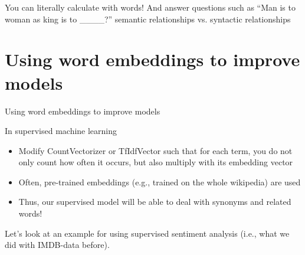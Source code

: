 \documentclass[compress]{beamer}
\begin{document}
\begin{frame}{You can literally calculate with words!}
	And answer questions such as ``Man is to woman as king is to \_\_\_\_?''
	semantic relationships vs. syntactic relationships
\end{frame}




\section[Improving models]{Using word embeddings to improve models}
\begin{frame}[plain]
	Using word embeddings to improve models
\end{frame}

\begin{frame}{In supervised machine learning}
	\begin{itemize}[<+->]
		\item Modify CountVectorizer or TfIdfVector such that for each term, you do not only count how often it occurs, but also multiply with its embedding vector
		\item Often, pre-trained embeddings (e.g., trained on the whole wikipedia) are used
		\item Thus, our supervised model will be able to deal with synonyms and related words!
	\end{itemize}
	
	\pause 
	Let's look at an example for using supervised sentiment analysis (i.e., what we did with IMDB-data before).
	
	
\end{frame}
\end{document}
